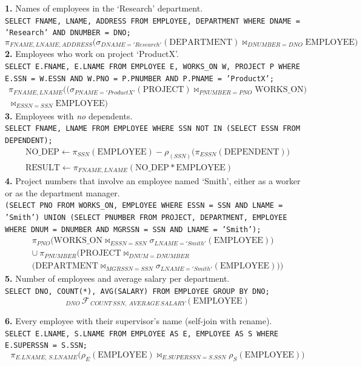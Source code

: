 \documentclass[10pt,a4paper]{article}
\newcommand{\R}[1]{\mathrm{#1}}          %
\newcommand{\agg}{\mathcal{F}}            %
\begin{document}
\begin{exbox}
\textbf{1.} Names of employees in the `Research' department.\\
\texttt{SELECT FNAME, LNAME, ADDRESS FROM EMPLOYEE, DEPARTMENT WHERE DNAME = 'Research' AND DNUMBER = DNO;}
\[ \pi_{FNAME,LNAME,ADDRESS}\big(\sigma_{DNAME='Research'}(\R{DEPARTMENT}) \bowtie_{DNUMBER=DNO} \R{EMPLOYEE}\big) \]
\textbf{2.} Employees who work on project `ProductX'.\\
\texttt{SELECT E.FNAME, E.LNAME FROM EMPLOYEE E, WORKS\_ON W, PROJECT P WHERE E.SSN = W.ESSN AND W.PNO = P.PNUMBER AND P.PNAME = 'ProductX';}
\begin{multline*}
\pi_{FNAME,LNAME}\Big(\big(\sigma_{PNAME='ProductX'}(\R{PROJECT}) \bowtie_{PNUMBER=PNO} \R{WORKS\_ON}\big)\\
\bowtie_{ESSN=SSN} \R{EMPLOYEE}\Big)
\end{multline*}
\textbf{3.} Employees with \emph{no} dependents.\\
\texttt{SELECT FNAME, LNAME FROM EMPLOYEE WHERE SSN NOT IN (SELECT ESSN FROM DEPENDENT);}
\begin{gather*}
\R{NO\_DEP} \leftarrow \pi_{SSN}(\R{EMPLOYEE}) - \rho_{(SSN)}\big(\pi_{ESSN}(\R{DEPENDENT})\big) \\
\R{RESULT} \leftarrow \pi_{FNAME,LNAME}(\R{NO\_DEP} * \R{EMPLOYEE})
\end{gather*}
\textbf{4.} Project numbers that involve an employee named `Smith', either as a worker or as the department manager.\\
\texttt{(SELECT PNO FROM WORKS\_ON, EMPLOYEE WHERE ESSN = SSN AND LNAME = 'Smith') UNION (SELECT PNUMBER FROM PROJECT, DEPARTMENT, EMPLOYEE WHERE DNUM = DNUMBER AND MGRSSN = SSN AND LNAME = 'Smith');}
\begin{multline*}
\pi_{PNO}\big(\R{WORKS\_ON} \bowtie_{ESSN=SSN} \sigma_{LNAME='Smith'}(\R{EMPLOYEE})\big)\\
\cup\ \pi_{PNUMBER}\Big(\R{PROJECT} \bowtie_{DNUM=DNUMBER}\\
\big(\R{DEPARTMENT} \bowtie_{MGRSSN=SSN} \sigma_{LNAME='Smith'}(\R{EMPLOYEE})\big)\Big)
\end{multline*}
\textbf{5.} Number of employees and average salary per department.\\
\texttt{SELECT DNO, COUNT(*), AVG(SALARY) FROM EMPLOYEE GROUP BY DNO;}
\[ {}_{DNO}\,\agg_{\,COUNT\ SSN,\ AVERAGE\ SALARY}(\R{EMPLOYEE}) \]

\textbf{6.} Every employee with their supervisor's name (self-join with rename).\\
\texttt{SELECT E.LNAME, S.LNAME FROM EMPLOYEE AS E, EMPLOYEE AS S WHERE E.SUPERSSN = S.SSN;}
\[ \pi_{E.LNAME,\,S.LNAME}\big(\rho_E(\R{EMPLOYEE}) \bowtie_{E.SUPERSSN=S.SSN} \rho_S(\R{EMPLOYEE})\big) \]
\end{exbox}
\end{document}
